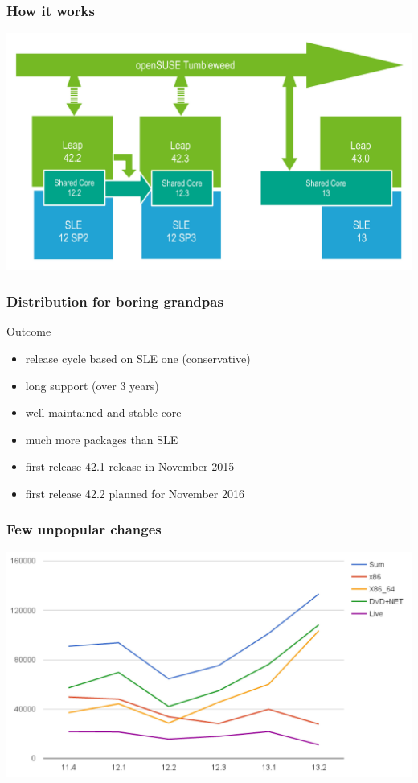 \documentclass{beamer}
\begin{document}
\begin{frame}
\frametitle{How it works}
\begin{center}
\includegraphics[width=.8\paperwidth]{leap-43}
\end{center}
\end{frame}

\begin{frame}[t]
\frametitle{Distribution for boring grandpas}
Outcome
\begin{itemize}
\item release cycle based on SLE one (conservative)
\item long support (over 3 years)
\item well maintained and stable core
\item much more packages than SLE
\item first release 42.1 release in November 2015
\item first release 42.2 planned for November 2016
\end{itemize}
\end{frame}

\begin{frame}
\frametitle{Few unpopular changes}
\begin{center}
\includegraphics[width=.8\paperwidth]{downloads}
\end{center}
\end{frame}

\end{document}
